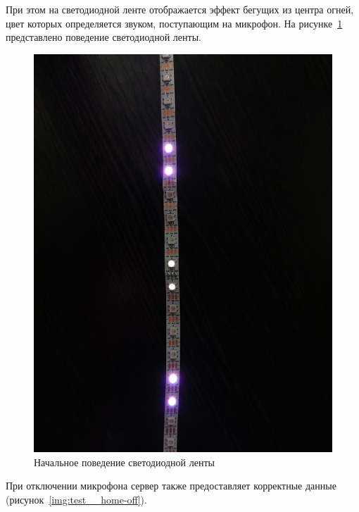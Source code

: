 При этом на светодиодной ленте отображается эффект бегущих из центра огней, цвет которых определяется звуком, поступающим на микрофон. На рисунке~\ref{img:test__state1} представлено поведение светодиодной ленты.

\begin{figure}[H]
  \centering
  \includegraphics[angle=90, height=0.3\textheight]{assets/images/practical/test__state1.jpg}
  \caption{Начальное поведение светодиодной ленты}
  \label{img:test__state1}
\end{figure}

При отключении микрофона сервер также предоставляет корректные данные (рисунок~\ref{img:test__home-off}).

